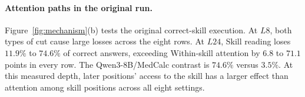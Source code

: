 \paragraph{Attention paths in the original run.}
Figure~\ref{fig:mechanism}(b) tests the original correct-skill execution.
At $L8$, both types of cut cause large losses across the eight rows.
At $L24$, Skill reading loses $11.9\%$ to $74.6\%$ of correct answers,
exceeding Within-skill attention by $6.8$ to $71.1$ points in every row.
The Qwen3-8B/MedCalc contrast is $74.6\%$ versus $3.5\%$.
At this measured depth, later positions' access to the skill has a
larger effect than attention among skill positions across all eight settings.
